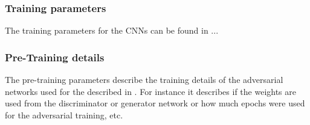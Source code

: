 
\subsubsection{Training parameters}
The training parameters for the CNNs can be found in ...




\subsubsection{Pre-Training details}

The pre-training parameters describe the training details of the adversarial networks used for the  described in .
For instance it describes if the weights are used from the discriminator or generator network or how much epochs were used for the adversarial training, etc.


%
%


